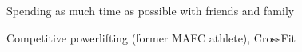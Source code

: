 


\begin{cvsimplelist}


    \item{Spending as much time as possible with friends and family}
    \item{Competitive powerlifting (former MAFC athlete), CrossFit}


\end{cvsimplelist}